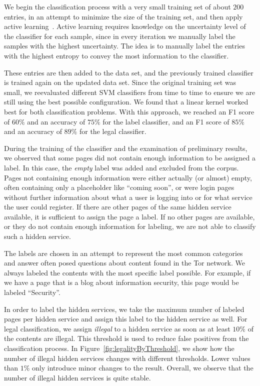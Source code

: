 We begin the classification process with a very small training set of about $200$ entries, in an attempt to minimize the size of the training set, and then apply active learning~\cite{Xu2009}. 
Active learning requires knowledge on the uncertainty level of the classifier for each sample, since in every iteration we manually label the samples with the highest uncertainty. The idea is to  manually label the entries with the highest entropy to convey the most information to the classifier.
 
 These entries are then added to the data set, and the previously trained classifier is trained again on the updated data set. Since the original training set was small, we reevaluated different SVM classifiers from time to time to ensure we are still using the best possible configuration. We found that a linear kernel worked best for both classification problems. With this approach, we reached an F1 score of $60\%$ and an accuracy of $75\%$ for the label classifier, and an F1 score of $85\%$ and an accuracy of $89\%$ for the legal classifier.

During  the training of the classifier and the examination of preliminary results, we observed that some pages did not contain enough information to be assigned a label. In this case, the \emph{empty} label was added and excluded from the corpus. Pages not containing enough information were either actually (or almost) empty, often containing only a placeholder like ``coming soon'', or were login pages without further information about what a user is logging into or for what service the user could register. If there are other pages of the same hidden service available, it is sufficient to assign the page a label. If no other pages are available, or they do not contain enough information for labeling, we are not able to classify such a hidden service.

The labels are chosen in an attempt to represent the most common categories and answer often posed questions about content found in the Tor network.
We always labeled the contents with the most specific label possible. For example, if we have a page that is a blog about information security, this page would be labeled ``Security''.

In order to label the hidden services, we take the maximum number of labeled pages per hidden service and assign this label to the hidden service as well. For legal classification, we assign \emph{illegal} to a hidden service as soon as at least $10\%$ of the contents are illegal. This threshold is used to reduce false positives from the classification process. In Figure~\ref{fig:legalityByThreshold}, we show how the number of illegal hidden services changes with different thresholds. Lower values than $1\%$ only introduce minor changes to the result. Overall, we observe that  the number of illegal hidden services is quite stable.
 

